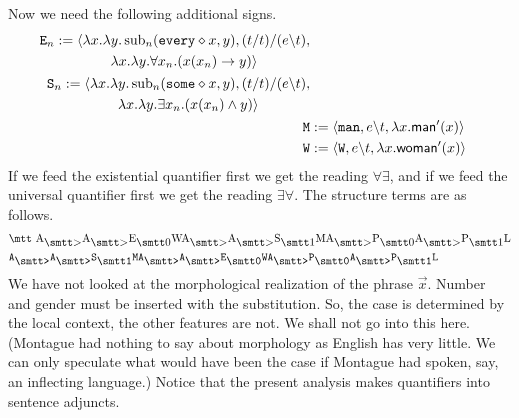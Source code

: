 Now we need the following additional signs.
\begin{align}
\begin{split}
\mbox{\tt E}_n & := \auf \lambda x.\lambda y.%
\subst_n(\mbox{\tt every}\oconc x, y),
    (t/t)/(e\backslash t), \\
	& \qquad\qquad \lambda x. \lambda y.\forall x_n.
    (x(x_n) \pf y)\zu 
\end{split} \\
\begin{split}
\mbox{\tt S}_n & := \auf \lambda x.\lambda y.%
\subst_n(\mbox{\tt some}\oconc x, y), (t/t)/(e\backslash t), \\
	& \qquad\qquad \lambda x. \lambda y.\exists x_n.
    (x(x_n) \und y)\zu 
\end{split} \\
\mbox{\tt M} & := \auf \mbox{\tt man}, e\backslash t,
    \lambda x.\mbox{\sf man}'(x)\zu \\
\mbox{\tt W} & := \auf \mbox{\tt W}, e\backslash t,
    \lambda x.\mbox{\sf woman}'(x)\zu
\end{align}
If we feed the existential quantifier first we get the reading
$\forall\exists$, and if we feed the universal quantifier first
we get the reading $\exists\forall$. The structure terms are as 
follows.
\begin{align}
& \mbox{\mtt A$_{\sgr}$A$_{\sgr}$E$_{\snull}$WA$_{\sgr}$A$_{\sgr}$S$%
_{\seins}$MA$_{\sgr}$P$_{\snull}$A$_{\sgr}$P$_{\seins}$L} \\
& \mbox{\tt A$_{\sgr}$A$_{\sgr}$S$_{\seins}$MA$_{\sgr}$A$_{\sgr}$%
E$_{\snull}$WA$_{\sgr}$P$_{\snull}$A$_{\sgr}$P$_{\seins}$L} 
\end{align}
We have not looked at the morphological realization of the phrase
$\vec{x}$. Number and gender must be inserted with the
substitution. So, the case is determined by the local context, the
other features are not. We shall not go into this here. (Montague
had nothing to say about morphology as English has very little. We
can only speculate what would have been the case if Montague had
spoken, say, an inflecting language.) Notice that the present analysis 
makes quantifiers into sentence adjuncts. 

